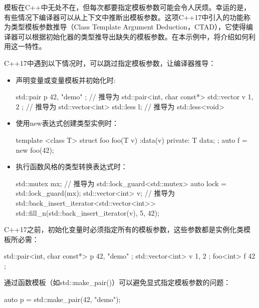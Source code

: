 模板在C++中无处不在，但每次都要指定模板参数可能会令人厌烦。幸运的是，有些情况下编译器可以从上下文中推断出模板参数。这项C++17中引入的功能称为类型模板参数推导（Class Template Argument Deduction，CTAD），它使得编译器可以根据初始化器的类型推导出缺失的模板参数。在本示例中，将介绍如何利用这一特性。


C++17中遇到以下情况时，可以跳过指定模板参数，让编译器推导：

\begin{itemize}
\item
声明变量或变量模板并初始化时:

\begin{cpp}
std::pair   p{ 42, "demo" };  // 推导为 std::pair<int, char const*>
std::vector v{ 1, 2 };        // 推导为 std::vector<int>
std::less   l;                // 推导为 std::less<void>
\end{cpp}

\item
使用new表达式创建类型实例时：

\begin{cpp}
template <class T>
struct foo
{
    foo(T v) :data(v) {}
    private:
    T data;
};
auto f = new foo(42);
\end{cpp}

\item
执行函数风格的类型转换表达式时：

\begin{cpp}
std::mutex mx;
// 推导为 std::lock_guard<std::mutex>
auto lock = std::lock_guard(mx);
std::vector<int> v;
// 推导为 std::back_insert_iterator<std::vector<int>>
std::fill_n(std::back_insert_iterator(v), 5, 42);
\end{cpp}
\end{itemize}


C++17之前，初始化变量时必须指定所有的模板参数，这些参数都是实例化类模板所必需：

\begin{cpp}
std::pair<int, char const*> p{ 42, "demo" };
std::vector<int>            v{ 1, 2 };
foo<int>                    f{ 42 };
\end{cpp}

通过函数模板（如std::make\_pair()）可以避免显式指定模板参数的问题：

\begin{cpp}
auto p = std::make_pair(42, "demo");
\end{cpp}


